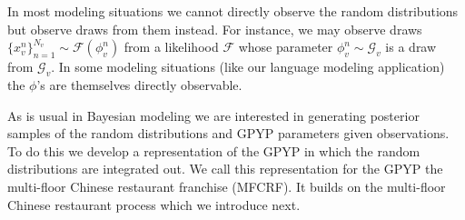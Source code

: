 \documentclass{article}
\newcommand{\comment}[1]{}
\begin{document}
In most modeling situations we cannot directly observe the random distributions but observe draws from them instead.  For instance, we may observe draws $\{x_v^n\}_{n=1}^{N_v} \sim \mathcal{F}(\phi_v^n)$ from a likelihood $\mathcal{F}$ whose parameter $\phi_v^n\sim\mathcal{G}_v$ is a draw from $\mathcal{G}_v$.  In some modeling situations (like our language modeling application) the $\phi$'s are themselves directly observable.  \comment{In our language modeling case we have a simple observation distribution $\mathcal{F}(\phi)=\delta_\phi$ placing all its mass on $\phi$.}
\comment{
\begin{eqnarray*}
f_v^n &\sim& \Lambda_v\\
\psi_v^n | f_v^n  &\sim&\mathcal{G}_{\mathrm{Pa}(v,f_v^n)}\\
x_v^n | \psi_v^n &\sim& \mathcal{F}(\cdot|\psi_v^n)
\end{eqnarray*}
%
where $\mathrm{Pa}(v,p)$ indexes the $p^{\mathrm{th}}$ parent of $v$ and  $f_v^n$ is an indicator variable that indicates from which component of the base mixture $\psi_v^n$ was drawn.

Let $\bx_v = \{x_v^n\}_{n=1}^{N_v}$ be the collection of observations from a single vertex $v$ and let $X = \{\bx_v : v \in V\}$ be the collection of all observations from all vertices in the DAG.  Let $\mathbf{\phi}_v = \{\phi_v^n\}_{n=1}^{N_v}$ $\Phi = \{\mathbf{\phi}_v : v \in V\}$ be the be the corresponding collections of parameters.   Then we have 
\[ P(X| \Phi) = \prod_{v \in V} P(\bx_v |\mathbf{\phi}_v ),  \hspace{.5cm} P(\Phi |  G ) = \prod_{v \in V} P(\mathbf{\phi}_v |G_v)\]
and
\[P(G | \Theta) = \prod_{v \in V}
P(G_v|d_v, \alpha_v,\{\lambda_{e_{v \rightarrow \mathrm{Pa}(v)}}\}, \{G_w : w \in \mathrm{Pa}(v)\}).\]
}

As is usual in Bayesian modeling we are interested in generating posterior samples of the random distributions and GPYP parameters given observations.  To do this we develop a representation of the GPYP in which the random distributions are integrated out.  We call this representation for the GPYP the multi-floor Chinese restaurant franchise (MFCRF).  It builds on the multi-floor Chinese restaurant process which we introduce next. 



\end{document}

